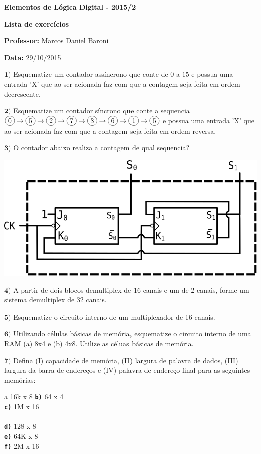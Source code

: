 \documentclass[12pt]{article}
\newcommand{\exerc}[3]{ \vspace*{25pt} {$\mathbf{#1)}$} #2 \hfill {\it #3} }
\newcommand{\exitem}[2]{ \texttt{\bf #1)} #2 \\ }
\newenvironment{exitems}[1]{
\\
\hspace*{30pt}
\begin{minipage}{0.8\textwidth}
\begin{multicols}{#1} 
}{
\end{multicols}
\end{minipage}
}
\newcommand*\circled[1]{\tikz[baseline=(char.base)]{
            \node[shape=circle,draw,inner sep=2pt] (char) {#1};}}
\begin{document}

\begin{center}
{\Large \bf Elementos de Lógica Digital - 2015/2}
\end{center}

{\large \bf Lista de exercícios}

{\bf Professor:} Marcos Daniel Baroni

{\bf Data:} 29/10/2015


\exerc{1}{Esquematize um contador assíncrono que conte de $0$ a $15$ e possua uma entrada 'X'
	que ao ser acionada faz com que a contagem seja feita em ordem decrescente.}{}

\exerc{2}{Esquematize um contador síncrono que conte a sequencia
	$\circled{0} \rightarrow
	\circled{5} \rightarrow
	\circled{2} \rightarrow
	\circled{7} \rightarrow
	\circled{3} \rightarrow
	\circled{6} \rightarrow
	\circled{1} \rightarrow \circled{5}$ e possua uma entrada 'X' que ao ser acionada faz com que a contagem
 	seja feita em ordem reversa.}{}

\exerc{3}{O contador abaixo realiza a contagem de qual sequencia?}{}
\begin{center}
		\includegraphics[scale=0.6]{cont1} \\ \vspace{15pt}
\end{center}

\exerc{4}{ A partir de dois blocos demultiplex de 16 canais e um de 2 canais, forme um sistema demultiplex de 32 canais.}{}

\exerc{5}{ Esquematize o circuito interno de um multiplexador de 16 canais.}{}

\exerc{6}{ Utilizando células básicas de memória, esquematize o circuito interno de uma RAM (a) 8x4 e (b) 4x8.
Utilize as céluas básicas de memória.}{}


\exerc{7}{Defina
(I) capacidade de memória,
(II) largura de palavra de dados,
(III) largura da barra de endereços e
(IV) palavra de endereço final
para as seguintes memórias:}{}
\begin{exitems}{2}
	\exitem{a}{ 16k x 8 }
	\exitem{b}{ 64 x 4 }
	\exitem{c}{ 1M x 16 }
	\\
	\exitem{d}{ 128 x 8 }
	\exitem{e}{ 64K x 8 }
	\exitem{f}{ 2M x 16 }
\end{exitems}
\end{document}
